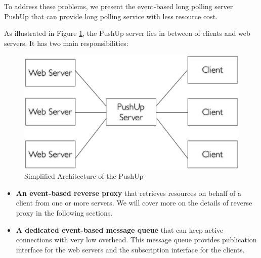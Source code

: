 To address these problems, we present the event-based\cite{UnixBook}  long polling 
server PushUp that can provide long polling service with less resource cost.

As illustrated in Figure \ref{fig:sim_pushup}, the PushUp server lies in 
between of clients and web servers. It has two main responsibilities:
\begin{figure}[htb!]
\centering
    \includegraphics[scale=0.40]{figures/sim_pushup.eps}
    \caption{Simplified Architecture of the PushUp}
    \label{fig:sim_pushup}
\end{figure}

\begin {itemize}
\item {\bf An event-based reverse proxy}\cite{ReverseProxy} that retrieves 
resources on behalf of a client from one or more servers. We will cover
more on the details of reverse proxy in the following sections.
\item {\bf A dedicated event-based message queue}\cite{PubSub} that can keep active 
connections with very low overhead. This message queue provides publication
interface for the web servers and the subscription interface for the clients.
\end {itemize}

